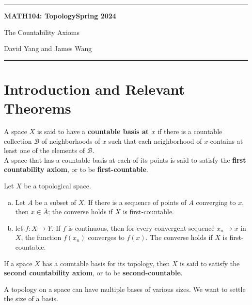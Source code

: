 \documentclass[11pt]{article}
\begin{document}
	\hrule
	\begin{center}
        \textbf{MATH104: Topology}\hfill \textbf{Spring 2024}\newline

		{\Large The Countability Axioms}

		David Yang and James Wang
	\end{center}

\hrule

\vspace{1em}

\section{Introduction and Relevant Theorems}

\begin{definition*}
A space $X$ is said to have a \textbf{countable basis at $x$} if there is a countable collection $\mathscr{B}$ of neighborhoods of $x$ such that each neighborhood of $x$ contains at least one of the elements of $\mathscr{B}$. \\

A space that has a countable basis at each of its points is said to satisfy the \textbf{first countability axiom}, or to be \textbf{first-countable}.
\end{definition*}

\begin{theorem*}
Let $X$ be a topological space. 
\begin{enumerate}[a)]
    \item Let $A$ be a subset of $X$. If there is a sequence of points of $A$ converging to $x$, then $x \in \overline{A}$; 
    the converse holds if $X$ is first-countable.
    \item let $f\colon X \rightarrow Y$. If $f$ is continuous, then for every convergent sequence $x_n \rightarrow x$ in $X$, the function
    $f(x_n)$ converges to $f(x)$. The converse holds if $X$ is first-countable.
\end{enumerate}
\end{theorem*}

\begin{definition*}
If a space $X$ has a countable basis for its topology, then $X$ is said to satisfy the \textbf{second countability axiom}, or to be
\textbf{second-countable}.
\end{definition*}

 A topology on a space can have multiple bases of various sizes. We want to settle the size of a basis.
\end{document}
